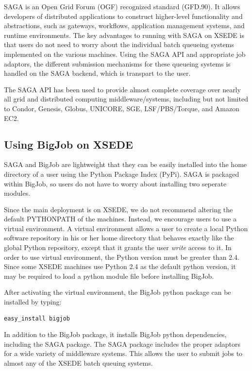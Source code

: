 \documentclass{sig-alternate}
\begin{document}
SAGA is an Open Grid Forum (OGF) recognized standard (GFD.90). 
It allows developers of distributed applications to construct
higher-level functionality and abstractions, such as
gateways, workflows, application management systems, and runtime
environments. The key advantages to running with SAGA on XSEDE
is that users do not need to worry about the individual batch
queueing systems implemented on the various machines. Using the 
SAGA API and appropriate job adaptors, the different submission
mechanisms for these queueing systems is handled on the SAGA backend,
which is transpart to the user.

The SAGA API has been used to provide almost complete
coverage over nearly all grid and distributed computing
middleware/systems, including but not limited to Condor, Genesis,
Globus, UNICORE, SGE, LSF/PBS/Torque, and Amazon EC2.

\subsection{Using BigJob on XSEDE}

SAGA and BigJob are lightweight that they can be easily installed into
the home directory of a user using the Python Package Index
(PyPi). SAGA is packaged within BigJob, so users do not have to worry
about installing two seperate modules.

Since the main deployment is on XSEDE, we do not recommend altering
the default PYTHONPATH of the machines. Instead, we encourage users to
use a virtual environment. A virtual environment allows a user to
create a local Python software repository in his or her home directory
that behaves exactly like the global Python repository, except that it
grants the user \textit{write} access to it. In order to use virtual
environment, the Python version must be greater than 2.4. Since some
XSEDE machines use Python 2.4 as the default python version, it may be
required to load a python module file before installing BigJob.

After activating the virtual environment, the BigJob python package
can be installed by typing:

\begin{lstlisting}[frame=single]
easy_install bigjob
\end{lstlisting}

In addition to the BigJob package, it installs BigJob python
dependencies, including the SAGA package. The SAGA package includes
the proper adaptors for a wide variety of middleware systems. This
allows the user to submit jobs to almost any of the XSEDE batch
queuing systems.
\end{document}
